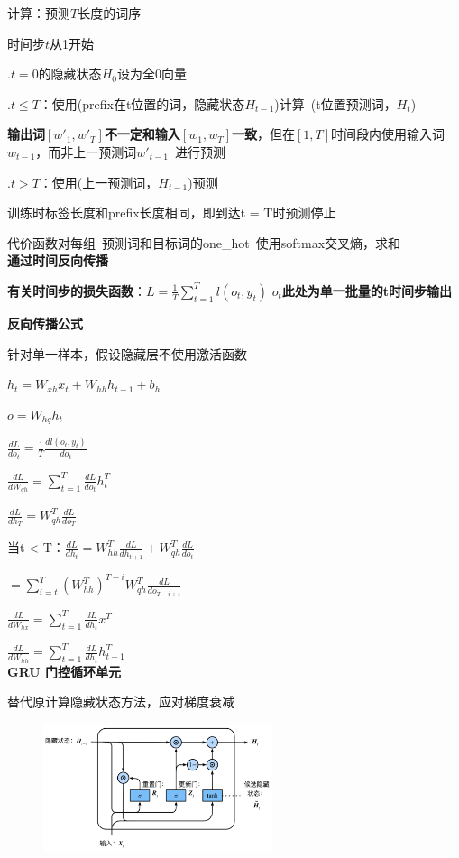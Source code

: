 \documentclass[UTF8]{ctexart}
\begin{document}
  \quad 计算：预测$T$长度的词序

  \quad \quad 时间步$t$从1开始

  \quad {}.$t = 0$的隐藏状态$H_0$设为全0向量

  \quad {}.$t \leq T$：使用(prefix在t位置的词，隐藏状态$H_{t-1}$)计算\ (t位置预测词，$H_t$)

  \quad \quad \quad \textbf{输出词$[w'_{1}, w'_{T}]$不一定和输入$[w_1, w_T]$一致}，但在$[1, T]$时间段内使用输入词$w_{t-1}$，而非上一预测词$w'_{t-1}$\ 进行预测
  
  \quad {}.$t > T$：使用(上一预测词，$H_{t-1}$)预测

  \quad \quad \quad 训练时标签长度和prefix长度相同，即到达t = T时预测停止
  
  \quad \quad 代价函数对每组\ 预测词和目标词的one\_hot\ 使用softmax交叉熵，求和\\
\textbf{通过时间反向传播}

  \textbf{有关时间步的损失函数}：$L = \frac{1}{T}\sum_{t = 1}^{T} l(o_t, y_t) $ \textbf{$o_t$此处为单一批量的t时间步输出}

  \textbf{反向传播公式} 
  
  \quad 针对单一样本，假设隐藏层不使用激活函数

  \quad \quad $h_t = W_{xh}x_t + W_{hh}h_{t-1} + b_h$

  \quad \quad $o = W_{hq}h_t$
  
  \quad $\frac{d L}{d o_t} = \frac{1}{T}\frac{d l(o_t, y_t)}{d o_t}$
  
  \quad $\frac{d L}{d W_{qh}} = \sum_{t=1}^{T}\frac{d L}{d o_t}h_t^T$
  
  \quad $\frac{d L}{d h_T} = W_{qh}^T\frac{d L}{d o_T}$
  
  \quad 当t < T：$\frac{d L}{d h_t} = W_{hh}^T\frac{d L}{d h_{t+1}} + W_{qh}^T\frac{d L}{d o_t}$
  
  \quad \quad $ = \sum_{i=t}^{T}(W_{hh}^T)^{T - i}W_{qh}^T\frac{d L}{d o_{T - i + t}}$
  
  \quad $\frac{d L}{d W_{hx}} = \sum_{t=1}^{T}\frac{d L}{d h_t}x^T$
  
  \quad $\frac{d L}{d W_{hh}} = \sum_{t=1}^{T}\frac{d L}{d h_t}h_{t-1}^T$\\
\textbf{GRU 门控循环单元}

  替代原计算隐藏状态方法，应对梯度衰减
  \begin{figure}[H] %
    \centering %
    \includegraphics[width=0.6\textwidth]{note_images/GRU.png} %
  \end{figure}
\end{document}
